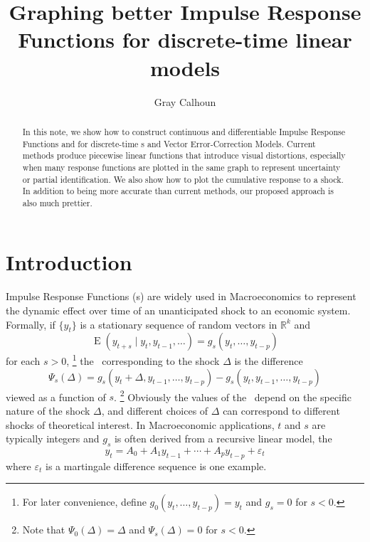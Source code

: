 \documentclass[12pt,fleqn]{article}
\title{Graphing better Impulse Response Functions for discrete-time
  linear models} \author{Gray Calhoun} 
\DeclareMathOperator{\E}{E}
\newcommand{\vep}{\varepsilon}
\newcommand{\RR}{\mathbb{R}}
\begin{document}
\maketitle
\begin{abstract}\noindent%
  In this note, we show how to construct continuous and differentiable
  Impulse Response Functions and for discrete-time \VAR s and Vector
  Error-Correction Models. Current methods produce piecewise linear
  functions that introduce visual distortions, especially when many
  response functions are plotted in the same graph to represent
  uncertainty or partial identification. We also show how to plot the
  cumulative response to a shock. In addition to being more accurate
  than current methods, our proposed approach is also much prettier.
\end{abstract}

\section{Introduction}

Impulse Response Functions (\IRF s) are widely used in Macroeconomics
to represent the dynamic effect over time of an unanticipated shock to
an economic system. Formally, if $\{y_t\}$ is a stationary sequence of
random vectors in $\RR^k$ and
\[
\E(y_{t+s} \mid y_t, y_{t-1},\dots) = g_s(y_t,\dots,y_{t-p})
\]
for each $s > 0$,%
\footnote{For later convenience, define
  $g_0(y_t,\dots,y_{t-p}) = y_t$ and $g_s = 0$ for $s < 0$.} %
the \IRF\ corresponding to the shock $\Delta$ is the difference
\[
\Psi_s(\Delta) = g_s(y_t + \Delta, y_{t-1},\dots,y_{t-p}) - g_s(y_t, y_{t-1},\dots,y_{t-p})
\]
viewed as a function of $s$.%
\footnote{Note that $\Psi_0(\Delta) = \Delta$ and $\Psi_s(\Delta) = 0$ for $s <
  0$.} %
Obviously the values of the \IRF\ depend on the specific nature of the
shock $\Delta$, and different choices of $\Delta$ can correspond to
different shocks of theoretical interest.  In Macroeconomic
applications, $t$ and $s$ are typically integers and $g_s$ is often
derived from a recursive linear model, the \VAR
\begin{equation}\label{eq:1}
  y_t = A_0 + A_1 y_{t-1} + \cdots + A_p y_{t-p} + \vep_t
\end{equation}
where $\vep_t$ is a martingale difference sequence is one example.
\end{document}
